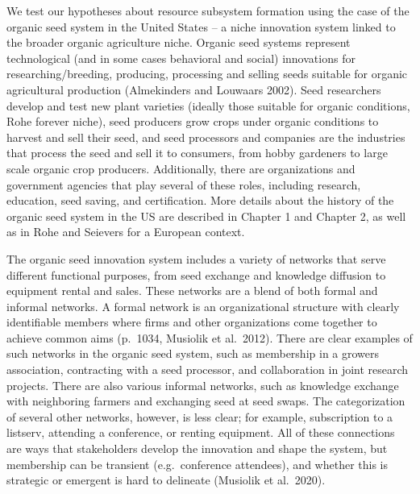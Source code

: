 \documentclass[twoside,12pt,final]{ucthesis-CA2012}
\begin{document}
\begin{ucmainmatter}
We test our hypotheses about resource subsystem formation using the case
of the organic seed system in the United States -- a niche innovation
system linked to the broader organic agriculture niche. Organic seed
systems represent technological (and in some cases behavioral and
social) innovations for researching/breeding, producing, processing and
selling seeds suitable for organic agricultural production (Almekinders
and Louwaars 2002). Seed researchers develop and test new plant
varieties (ideally those suitable for organic conditions, Rohe forever
niche), seed producers grow crops under organic conditions to harvest
and sell their seed, and seed processors and companies are the
industries that process the seed and sell it to consumers, from hobby
gardeners to large scale organic crop producers. Additionally, there are
organizations and government agencies that play several of these roles,
including research, education, seed saving, and certification. More
details about the history of the organic seed system in the US are
described in Chapter 1 and Chapter 2, as well as in Rohe and Seievers
for a European context.

The organic seed innovation system includes a variety of networks that
serve different functional purposes, from seed exchange and knowledge
diffusion to equipment rental and sales. These networks are a blend of
both formal and informal networks. A formal network is an
\textquotesingle organizational structure with clearly identifiable members where firms
and other organizations come together to achieve common aims\textquotesingle{} (p.~1034,
Musiolik et al.~2012). There are clear examples of such networks in the
organic seed system, such as membership in a grower\textquotesingle s association,
contracting with a seed processor, and collaboration in joint research
projects. There are also various informal networks, such as knowledge
exchange with neighboring farmers and exchanging seed at seed swaps. The
categorization of several other networks, however, is less clear; for
example, subscription to a listserv, attending a conference, or renting
equipment. All of these connections are ways that stakeholders develop
the innovation and shape the system, but membership can be transient
(e.g.~conference attendees), and whether this is strategic or emergent
is hard to delineate (Musiolik et al.~2020).


\end{ucmainmatter}
\end{document}

